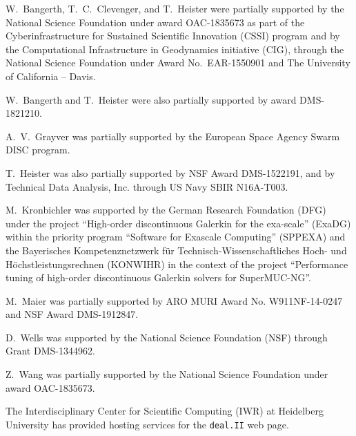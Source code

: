 \documentclass{ansarticle-preprint}
\newcommand{\specialword}[1]{\texttt{#1}}
\newcommand{\dealii}{{\specialword{deal.II}}\xspace}
\begin{document}
W.~Bangerth, T.~C.~Clevenger, and T.~Heister were partially
supported by the National Science Foundation under award OAC-1835673
as part of the Cyberinfrastructure for Sustained Scientific Innovation (CSSI)
program  and by the Computational Infrastructure
in Geodynamics initiative (CIG), through the National Science
Foundation under Award No.~EAR-1550901 and The
University of California -- Davis.

W.~Bangerth and T.~Heister were also partially supported by award DMS-1821210.


A.~V.~Grayver was partially supported by the European Space Agency
Swarm DISC program.

T.~Heister was also partially supported by NSF Award DMS-1522191, and
by Technical Data Analysis, Inc. through US Navy SBIR N16A-T003.

M.~Kronbichler was supported by the German
Research Foundation (DFG) under the project ``High-order discontinuous
Galerkin for the exa-scale'' (\mbox{ExaDG}) within the priority program ``Software
for Exascale Computing'' (SPPEXA) and the Bayerisches Kompetenznetzwerk
f\"ur Technisch-Wissen\-schaft\-li\-ches Hoch- und H\"ochstleistungsrechnen
(KONWIHR) in the context of the project
``Performance tuning of high-order discontinuous Galerkin solvers for
SuperMUC-NG''.

M.~Maier was partially supported by ARO MURI Award No. W911NF-14-0247 and
NSF Award DMS-1912847.

D.~Wells was supported by the National Science Foundation (NSF) through Grant
DMS-1344962.

Z.~Wang was partially
supported by the National Science Foundation under award OAC-1835673.

The Interdisciplinary Center for Scientific Computing (IWR) at Heidelberg
University has provided hosting services for the \dealii{} web page.


{}

\end{document}
